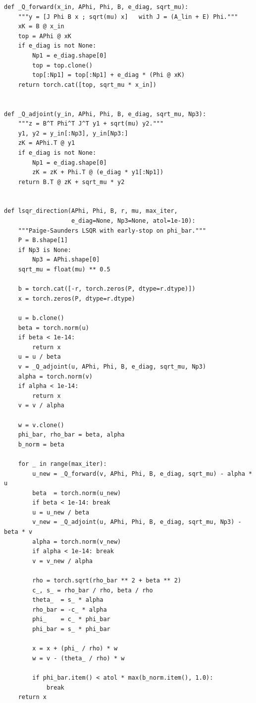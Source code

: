 \documentclass[11pt,a4paper]{article}
\begin{document}
\begin{lstlisting}[caption={Method 2: matrix-free forward and adjoint operators, plus LSQR.},label={lst:m2}]
def _Q_forward(x_in, APhi, Phi, B, e_diag, sqrt_mu):
    """y = [J Phi B x ; sqrt(mu) x]   with J = (A_lin + E) Phi."""
    xK = B @ x_in
    top = APhi @ xK
    if e_diag is not None:
        Np1 = e_diag.shape[0]
        top = top.clone()
        top[:Np1] = top[:Np1] + e_diag * (Phi @ xK)
    return torch.cat([top, sqrt_mu * x_in])


def _Q_adjoint(y_in, APhi, Phi, B, e_diag, sqrt_mu, Np3):
    """z = B^T Phi^T J^T y1 + sqrt(mu) y2."""
    y1, y2 = y_in[:Np3], y_in[Np3:]
    zK = APhi.T @ y1
    if e_diag is not None:
        Np1 = e_diag.shape[0]
        zK = zK + Phi.T @ (e_diag * y1[:Np1])
    return B.T @ zK + sqrt_mu * y2


def lsqr_direction(APhi, Phi, B, r, mu, max_iter,
                   e_diag=None, Np3=None, atol=1e-10):
    """Paige-Saunders LSQR with early-stop on phi_bar."""
    P = B.shape[1]
    if Np3 is None:
        Np3 = APhi.shape[0]
    sqrt_mu = float(mu) ** 0.5

    b = torch.cat([-r, torch.zeros(P, dtype=r.dtype)])
    x = torch.zeros(P, dtype=r.dtype)

    u = b.clone()
    beta = torch.norm(u)
    if beta < 1e-14:
        return x
    u = u / beta
    v = _Q_adjoint(u, APhi, Phi, B, e_diag, sqrt_mu, Np3)
    alpha = torch.norm(v)
    if alpha < 1e-14:
        return x
    v = v / alpha

    w = v.clone()
    phi_bar, rho_bar = beta, alpha
    b_norm = beta

    for _ in range(max_iter):
        u_new = _Q_forward(v, APhi, Phi, B, e_diag, sqrt_mu) - alpha * u
        beta  = torch.norm(u_new)
        if beta < 1e-14: break
        u = u_new / beta
        v_new = _Q_adjoint(u, APhi, Phi, B, e_diag, sqrt_mu, Np3) - beta * v
        alpha = torch.norm(v_new)
        if alpha < 1e-14: break
        v = v_new / alpha

        rho = torch.sqrt(rho_bar ** 2 + beta ** 2)
        c_, s_ = rho_bar / rho, beta / rho
        theta_  = s_ * alpha
        rho_bar = -c_ * alpha
        phi_    = c_ * phi_bar
        phi_bar = s_ * phi_bar

        x = x + (phi_ / rho) * w
        w = v - (theta_ / rho) * w

        if phi_bar.item() < atol * max(b_norm.item(), 1.0):
            break
    return x
\end{lstlisting}
\end{document}
